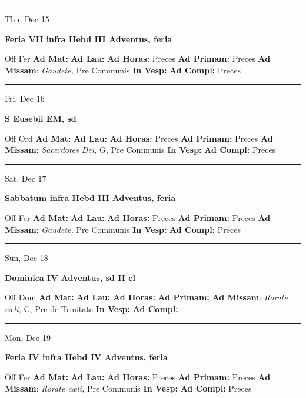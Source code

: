 \documentclass[letterpaper, 10pt]{article}
\begin{document}
\hrule
\begin{center}
Thu, Dec 15
\end{center}\textbf{ \large Feria VII infra Hebd III Adventus, \textnormal{\normalsize feria}}
\begin{justify}
Off Fer
\textbf{Ad Mat: }
\textbf{Ad Lau: }
\textbf{Ad Horas: }Preces
\textbf{Ad Primam: }Preces
\textbf{Ad Missam}: \textit{Gaudete,} Pre Communis
\textbf{In Vesp: }
\textbf{Ad Compl: }Preces\end{justify}



\hrule
\begin{center}
Fri, Dec 16
\end{center}\textbf{ \large S Eusebii EM, \textnormal{\normalsize sd}}
\begin{justify}
Off Ord
\textbf{Ad Mat: }
\textbf{Ad Lau: }
\textbf{Ad Horas: }Preces
\textbf{Ad Primam: }Preces
\textbf{Ad Missam}: \textit{Sacerdotes Dei,} G, Pre Communis
\textbf{In Vesp: }
\textbf{Ad Compl: }Preces\end{justify}



\hrule
\begin{center}
Sat, Dec 17
\end{center}\textbf{ \large Sabbatum infra Hebd III Adventus, \textnormal{\normalsize feria}}
\begin{justify}
Off Fer
\textbf{Ad Mat: }
\textbf{Ad Lau: }
\textbf{Ad Horas: }Preces
\textbf{Ad Primam: }Preces
\textbf{Ad Missam}: \textit{Gaudete,} Pre Communis
\textbf{In Vesp: }
\textbf{Ad Compl: }Preces\end{justify}



\hrule
\begin{center}
Sun, Dec 18
\end{center}\textbf{ \large Dominica IV Adventus, \textnormal{\normalsize sd II cl}}
\begin{justify}
Off Dom
\textbf{Ad Mat: }
\textbf{Ad Lau: }
\textbf{Ad Horas: }
\textbf{Ad Primam: }
\textbf{Ad Missam}: \textit{Rorate cæli,} C, Pre de Trinitate
\textbf{In Vesp: }
\textbf{Ad Compl: }\end{justify}



\hrule
\begin{center}
Mon, Dec 19
\end{center}\textbf{ \large Feria IV infra Hebd IV Adventus, \textnormal{\normalsize feria}}
\begin{justify}
Off Fer
\textbf{Ad Mat: }
\textbf{Ad Lau: }
\textbf{Ad Horas: }Preces
\textbf{Ad Primam: }Preces
\textbf{Ad Missam}: \textit{Rorate cæli,} Pre Communis
\textbf{In Vesp: }
\textbf{Ad Compl: }Preces\end{justify}
\end{document}
